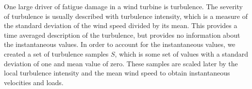 \documentclass[11pt,letterpaper]{article}
\providecommand{\DIFaddbegin}{} %
\newcommand{\DIFaddincludegraphics}[2][]{{\color{blue}\fbox{\DIFOincludegraphics[#1]{#2}}}} %
\DeclareRobustCommand{\DIFaddbegin}{\DIFOaddbegin \let\includegraphics\DIFaddincludegraphics} %
\begin{document}
% 

One large driver of fatigue damage in a wind turbine is turbulence. The severity of turbulence is usually described with turbulence intensity, which is a measure of the standard deviation of the wind speed divided by its mean. This provides a time averaged description of the turbulence, but provides no information about the instantaneous values. In order to account for the instantaneous values, we created a set of turbulence samples $S$, which is some set of values with a standard deviation of one and mean value of zero. These samples are scaled later by the local turbulence intensity and the mean wind speed to obtain instantaneous velocities and loads. 

\DIFaddbegin 
\end{document}
